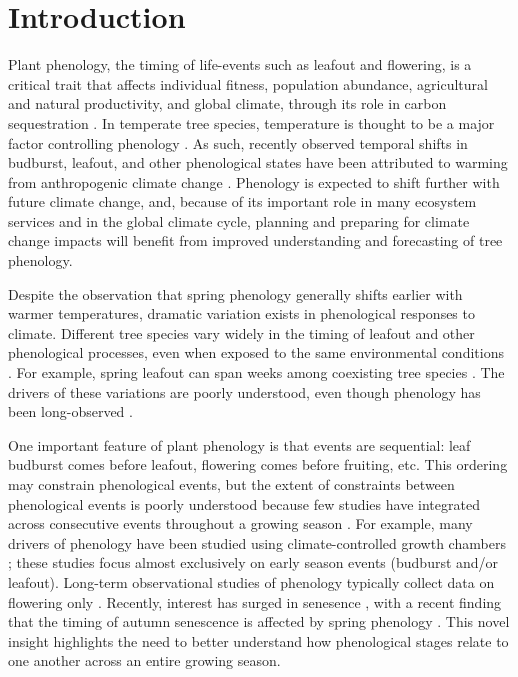 \documentclass{article}
\begin{document}
\section* {Introduction}
Plant phenology, the timing of life-events such as leafout and flowering, is a critical trait that affects individual fitness, population abundance, agricultural and natural productivity, and global climate, through its role in carbon sequestration \citep{miller-rushing2008,primack2009a,willis2010,miller-rushing2010}. In temperate tree species, temperature is thought to be a major factor controlling phenology \citep{parmesan2006, morin2010,schwartz2013}. As such, recently observed temporal shifts in budburst, leafout, and other phenological states have been attributed to warming from anthropogenic climate change \citep{parmesan2006}. Phenology is expected to shift further with future climate change, and, because of its important role in many ecosystem services and in the global climate cycle, planning and preparing for climate change impacts will benefit from improved understanding and forecasting of tree phenology.
\par Despite the observation that spring phenology generally shifts earlier with warmer temperatures, dramatic variation exists in phenological responses to climate. Different tree species vary widely in the timing of leafout and other phenological processes, even when exposed to the same environmental conditions \citep{lechowicz1984,primack2009c}. For example, spring leafout can span weeks among coexisting tree species \citep{lechowicz1984}. The drivers of these variations are poorly understood, even though phenology has been long-observed \citep{wolkovich2014}.
\par One important feature of plant phenology is that events are sequential: leaf budburst comes before leafout, flowering comes before fruiting, etc. This ordering may constrain phenological events, but the extent of constraints between phenological events is poorly understood because few studies have integrated across consecutive events throughout a growing season \citep{wolkovich2014}. For example, many drivers of phenology have been studied using climate-controlled growth chambers \citep[e.g.,][]{basler2012, laube2014}; these studies focus almost exclusively on early season events (budburst and/or leafout).  Long-term observational studies of phenology typically collect data on flowering only  \citep [e.g. 64\% of studies in ][]{wolkovich2012nectar}. Recently, interest has surged in senesence  \citep [e.g.][]{}, with a recent finding that the timing of autumn senescence is affected by spring phenology \citep {keenan2015}. This novel insight highlights the need to better understand how phenological stages relate to one another across an entire growing season. 
\end{document}
